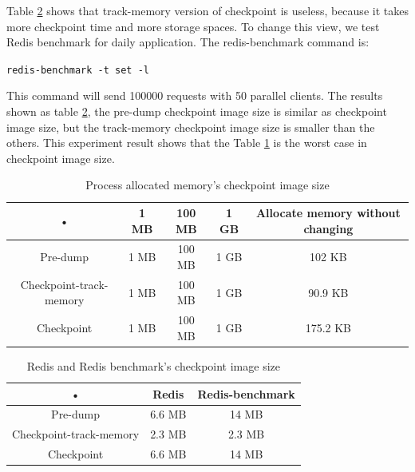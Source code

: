 Table \ref{table:redis image size} shows that track-memory version of checkpoint is useless, because it takes more checkpoint time and more storage spaces. To change this view, we test Redis benchmark for daily application. The redis-benchmark command is:
\begin{center}
\texttt{redis-benchmark -t set -l}
\end{center}
This command will send 100000 requests with 50 parallel clients. The results shown as table \ref{table:redis image size}, the pre-dump checkpoint image size is similar as checkpoint image size, but the track-memory checkpoint image size is smaller than the others. This experiment result shows that the Table \ref{table:process image size} is the worst case in checkpoint image size.

\begin{table}[hbtp]
\begin{center}
\begin{tabular}{|c|c|c|c|c|}\hline 
• & 1 MB & 100 MB & 1 GB & Allocate memory without changing\\ 
\hline 
Pre-dump & 1 MB & 100 MB & 1 GB & 102 KB\\ 
\hline 
Checkpoint-track-memory & 1 MB & 100 MB & 1 GB & 90.9 KB \\ 
\hline 
Checkpoint & 1 MB & 100 MB & 1 GB & 175.2 KB \\ 
\hline 
\end{tabular}
\caption{Process allocated memory's checkpoint image size}
\label{table:process image size}
\end{center}
\end{table}

\begin{table}[hbtp]
\begin{center}
\begin{tabular}{|c|c|c|}
\hline 
• & Redis & Redis-benchmark \\ 
\hline 
Pre-dump & 6.6 MB & 14 MB \\ 
\hline 
Checkpoint-track-memory & 2.3 MB & 2.3 MB \\ 
\hline 
Checkpoint & 6.6 MB & 14 MB \\ 
\hline 
\end{tabular}
\caption{Redis and Redis benchmark's checkpoint image size}
\label{table:redis image size}
\end{center}
\end{table}

